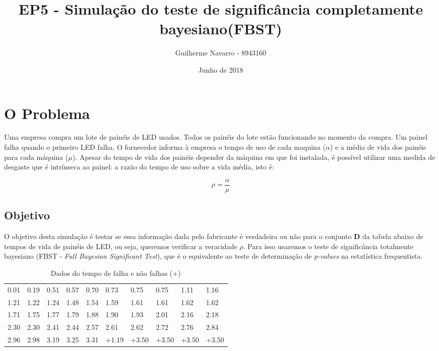 \documentclass{article} %
\begin{document}
\title{EP5 - Simulação do teste de significância completamente bayesiano(FBST)} %
\author{Guilherme Navarro - 8943160} %
\date{Junho de 2018} %

\maketitle	

	
\section{O Problema}
	Uma empresa compra um lote de painéis de LED usados. Todos os painéis do lote estão funcionando no momento da compra. Um painel falha quando o primeiro LED falha. O fornecedor informa à empresa o tempo de uso de cada maquina ($\alpha$) e a média de vida dos painéis para cada máquina ($\mu$). Apesar do tempo de vida dos painéis depender da máquina em que foi instalada, é possível utilizar uma medida de desgaste que é intrínseca ao painel: a razão do tempo de uso sobre a vida média, isto é: 
	
\begin{equation}
\rho = \frac{\alpha}{\mu}
\end{equation}
    
\subsection{Objetivo}
	O objetivo desta simulação é testar se essa informação dada pelo fabricante é verdadeira ou não para o conjunto \textbf{D} da tabela abaixo de tempos de vida de painéis de LED, ou seja, queremos verificar a veracidade $\rho$. Para isso usaremos o teste de significância totalmente bayesiano (FBST - \textit{Full Bayesian Significant Test}), que é o equivalente ao teste de determinação de \textit{p-values} na estatística frequentista. 
    
\begin{table}
\centering
\caption{Dados do tempo de falha e não falhas (+)}
\begin{tabular}{llllllllll}
\hline
0.01 & 0.19 & 0.51 & 0.57 & 0.70 & 0.73 & 0.75 & 0.75 & 1.11 & 1.16 \\
1.21 & 1.22 & 1.24 & 1.48 & 1.54 & 1.59 & 1.61 & 1.61 & 1.62 & 1.62 \\
1.71 & 1.75 & 1.77 & 1.79 & 1.88 & 1.90 & 1.93 & 2.01 & 2.16 & 2.18 \\
2.30 & 2.30 & 2.41 & 2.44 & 2.57 & 2.61 & 2.62 & 2.72 & 2.76 & 2.84 \\
2.96 & 2.98 & 3.19 & 3.25 & 3.31 & +1.19 & +3.50 & +3.50 & +3.50 & +3.50 \\ \hline
\end{tabular}
\end{table}
	
\end{document}
